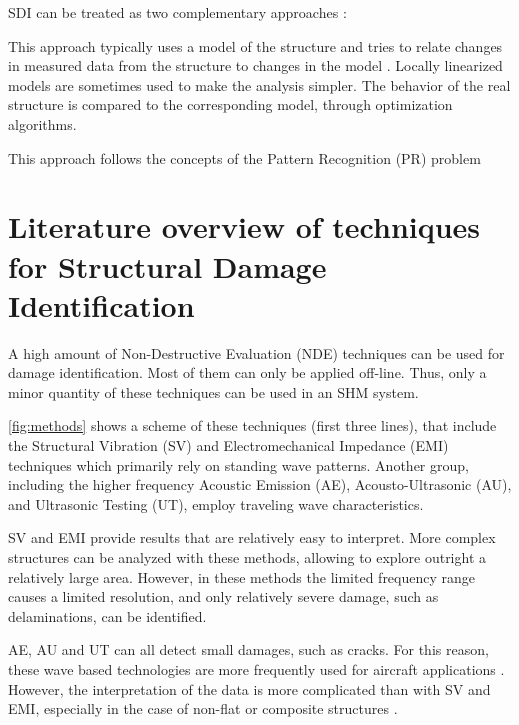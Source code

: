 SDI can be treated as two complementary approaches \cite{Montanari2014}:
\begin{description}[style=sameline]
\item[Inverse problem] This approach typically uses a model of the structure and tries to relate changes in measured data from the structure to changes in the model \cite{friswell2007damage}. Locally linearized models are sometimes used to make the analysis simpler. The behavior of the real structure is compared to the corresponding model, through optimization algorithms.
\item[Pattern recognition problem] This approach follows the concepts of the Pattern Recognition (PR) problem 
\end{description}

\section{Literature overview of techniques for Structural Damage Identification}
\label{chap:state}

A high amount of Non-Destructive Evaluation (NDE) techniques can be used for damage identification. Most of them can only be applied off-line. Thus, only a minor quantity of these techniques can be used in an SHM system.

\autoref{fig:methods} shows a scheme of these techniques (first three lines), that include the Structural Vibration (SV) and Electromechanical Impedance (EMI) techniques which primarily rely on standing wave patterns. Another group, including the higher frequency Acoustic Emission (AE), Acousto-Ultrasonic (AU), and Ultrasonic Testing (UT), employ traveling wave characteristics.

SV and EMI provide results that are relatively easy to interpret. More complex structures can be analyzed with these methods, allowing to explore outright a relatively large area. However, in these methods the limited frequency range causes a limited resolution, and only relatively severe damage, such as delaminations, can be identified.

AE, AU and UT can all detect small damages, such as cracks. For this reason, these wave based technologies are more frequently used for aircraft applications \cite{Staszewski2009,Diamanti2010}. However, the interpretation of the data is more complicated than with SV and EMI, especially in the case of non-flat or composite structures \cite{Dalton2001}.

